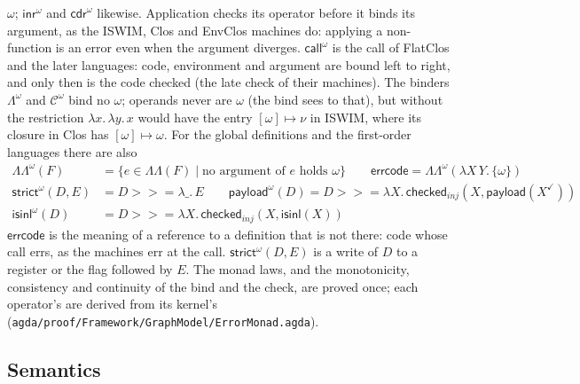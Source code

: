 \documentclass[10pt]{article}
\theoremstyle{acmplain}
\newcommand{\key}[1]{\mathsf{#1}}
\newcommand{\lam}[1]{\lambda #1.\,}
\newcommand{\bind}{\mathbin{>\!\!>\!\!=}}
\begin{document}
$\omega$; $\key{inr}^{\omega}$ and $\key{cdr}^{\omega}$ likewise.
Application checks its operator before it binds its argument, as the
ISWIM, Clos and EnvClos machines do: applying a non-function is an error
even when the argument diverges. $\key{call}^{\omega}$ is the call of
FlatClos and the later languages: code, environment and argument are bound
left to right, and only then is the code checked (the late check of
their machines). The binders $\Lambda^{\omega}$ and $\mathcal{C}^{\omega}$
bind no $\omega$; operands never are $\omega$ (the bind sees to that),
but without the restriction $\lam{x}\lam{y} x$ would have the entry
$[\omega] \mapsto \nu$ in ISWIM, where its closure in Clos has
$[\omega] \mapsto \omega$. For the global definitions and the
first-order languages there are also
\begin{align*}
  \Lambda\Lambda^{\omega}(F) &= \{ e \in \Lambda\Lambda(F) \mid \text{no argument of } e \text{ holds } \omega \} \qquad
  \key{errcode} = \Lambda\Lambda^{\omega}(\lambda X\, Y.\, \{\omega\}) \\
  \key{strict}^{\omega}(D, E) &= D \bind \lambda \_.\, E \qquad
  \key{payload}^{\omega}(D) = D \bind \lambda X.\, \key{checked}_{\mathit{inj}}(X, \key{payload}(X^{\checkmark})) \\
  \key{isinl}^{\omega}(D) &= D \bind \lambda X.\, \key{checked}_{\mathit{inj}}(X, \key{isinl}(X))
\end{align*}
$\key{errcode}$ is the meaning of a reference to a definition that is
not there: code whose call errs, as the machines err at the call.
$\key{strict}^{\omega}(D, E)$ is a write of $D$ to a register or the flag
followed by $E$. The monad laws, and the monotonicity, consistency and
continuity of the bind and the check, are proved once; each operator's
are derived from its kernel's
(\texttt{agda/proof/Framework/GraphModel/ErrorMonad.agda}).

\subsection{Semantics}
\end{document}
